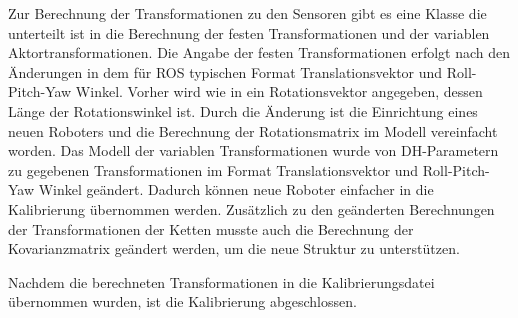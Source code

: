 Zur Berechnung der Transformationen zu den Sensoren gibt es eine Klasse die 
unterteilt ist in die Berechnung der festen Transformationen und der variablen
Aktortransformationen. Die Angabe der festen Transformationen erfolgt nach den
Änderungen in dem für \ac{ROS} typischen Format Translationsvektor und
Roll-Pitch-Yaw Winkel. Vorher wird wie in \cite[Abschnitt 3.3.2]{pr2_estimation}
ein Rotationsvektor angegeben, dessen Länge der Rotationswinkel ist. 
Durch die Änderung ist die Einrichtung eines neuen Roboters und die Berechnung
der Rotationsmatrix im Modell vereinfacht worden. 
Das Modell der variablen Transformationen wurde von \ac{DH-Parameter}n zu
gegebenen Transformationen im Format Translationsvektor und 
Roll-Pitch-Yaw Winkel geändert. Dadurch können neue Roboter einfacher in die 
Kalibrierung übernommen werden. 
Zusätzlich zu den geänderten Berechnungen der Transformationen der Ketten musste
auch die Berechnung der Kovarianzmatrix geändert werden, um die neue Struktur zu 
unterstützen. 

Nachdem die berechneten Transformationen in die Kalibrierungsdatei übernommen 
wurden, ist die Kalibrierung abgeschlossen.

